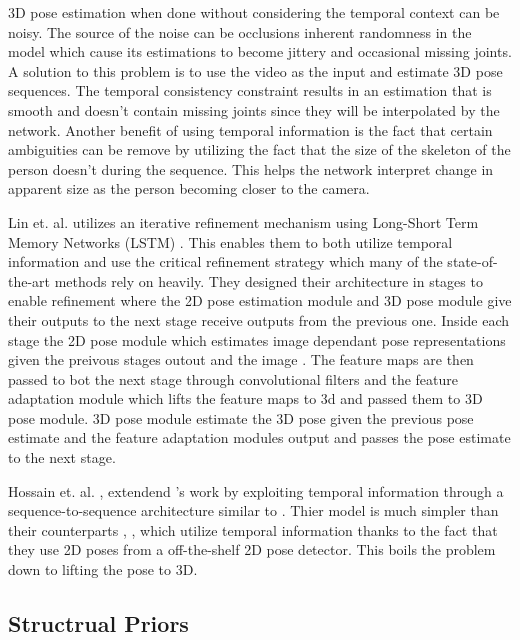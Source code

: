 3D pose estimation when done without considering the temporal context can be noisy. The source of the noise can be occlusions inherent randomness in the model which cause its estimations to become jittery and occasional missing joints. A solution to this problem is to use the video as the input and estimate 3D pose sequences. The temporal consistency constraint results in an estimation that is smooth and doesn't contain missing joints since they will be interpolated by the network. Another benefit of using temporal information is the fact that certain ambiguities can be remove by utilizing the fact that the size of the skeleton of the person doesn't during the sequence. This helps the network interpret change in apparent size as the person becoming closer to the camera.

Lin et. al. \parencite{lin2017recurrent} utilizes an iterative refinement mechanism using Long-Short Term Memory Networks (LSTM) \parencite{hochreiter1997long}. This enables them to both utilize temporal information and use the critical refinement strategy which many of the state-of-the-art methods rely on heavily. They designed their architecture in stages to enable refinement where the 2D pose estimation module and 3D pose module give their outputs to the next stage receive outputs from the previous one. Inside each stage the 2D pose module which estimates image dependant pose representations given the preivous stages outout and the image . The feature maps are then passed to bot the next stage through convolutional filters and the feature adaptation module which lifts the feature maps to 3d and passed them to 3D pose module. 3D pose module estimate the 3D pose given the previous pose estimate and the feature adaptation modules output and passes the pose estimate to the next stage.

Hossain et. al. \parencite{hossain2017exploiting}, \parencite{hossain2017understanding} extendend \parencite{martinez2017simple}'s work by exploiting temporal information through a sequence-to-sequence architecture similar to \parencite{sutskever2014sequence}. Thier model is much simpler than their counterparts \parencite{lin2017recurrent
}, \parencite{bogo2016keep}, \parencite{mehta2017vnect} which utilize temporal information thanks to the fact that they use 2D poses from a off-the-shelf 2D pose detector. This boils the problem down to lifting the pose to 3D.

\subsection{Structrual Priors}

